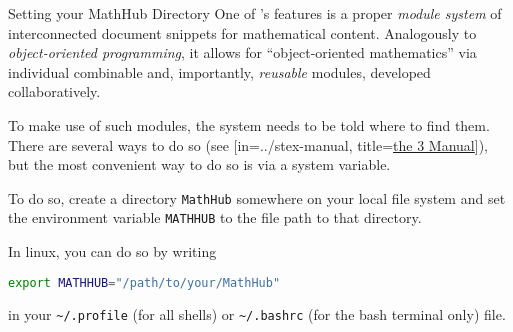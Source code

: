   \begin{sfragment}{Setting your MathHub Directory}
    One of \sTeX's features is a proper \emph{module system}
    of interconnected document snippets for mathematical
    content. Analogously to \emph{object-oriented programming},
    it allows for ``object-oriented mathematics'' via individual
    combinable and, importantly, \emph{reusable} modules, developed
    collaboratively.

    To make use of such modules, the \sTeX system needs to be told
    where to find them. There are several ways to do so (see
    [in=../stex-manual,
        title={\href{\basedocurl/stex-manual.pdf}{the \sTeX{}3 Manual}}]),
    but the most convenient way to do so is via a system variable.

    To do so, create a directory \texttt{MathHub} somewhere on
    your local file system and set the environment
    variable \texttt{MATHHUB} to the file path to that directory.

    In linux, you can do so by writing 
    \begin{lstlisting}[language=bash]
        export MATHHUB="/path/to/your/MathHub"
    \end{lstlisting}
    in your \verb|~/.profile| (for all shells) or \verb|~/.bashrc|
    (for the bash terminal only) file.
  \end{sfragment}